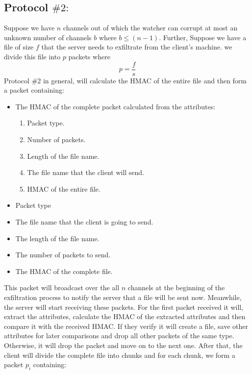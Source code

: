\documentclass[main.tex]{subfiles}
\begin{document}
\subsection{Protocol $\#2:$}
Suppose we have $n$ channels out of which the watcher can corrupt at most an unknown number of channels $b$ where $b \leq (n-1)$. Further, Suppose we have a file of size $f$ that the server needs to exfiltrate from the client's machine. we divide this file into $p$ packets where \[p = \frac{f}{s}\] Protocol \#2 in general, will calculate the HMAC of the entire file and then form a packet containing: \begin{itemize}
\item The HMAC of the complete packet calculated from the attributes:
\begin{enumerate}
\item Packet type.
\item Number of packets.
\item Length of the file name.
\item The file name that the client will send.
\item HMAC of the entire file.
\end{enumerate}
\item Packet type
\item The file name that the client is going to send.
\item The length of the file name.
\item The number of packets to send.
\item The HMAC of the complete file.
\end{itemize} This packet will broadcast over the all $n$ channels at the beginning of the exfiltration process to notify the server that a file will be sent now. Meanwhile, the server will start receiving these packets. For the first packet received it will, extract the attributes, calculate the HMAC of the extracted attributes and then compare it with the received HMAC. If they verify it will create a file, save other attributes for later comparisons and drop all other packets of the same type. Otherwise, it will drop the packet and move on to the next one. After that, the client will divide the complete file into chunks and for each chunk, we form a packet $p_{i}$ containing: 
\end{document}
